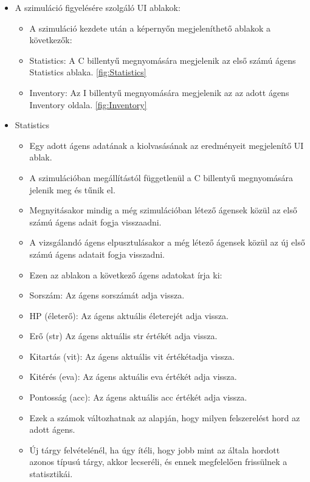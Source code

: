 \begin{itemize}
    \item A szimuláció figyelésére szolgáló UI ablakok:
    
    \begin{itemize}
        \item A szimuláció kezdete után a képernyőn megjeleníthető ablakok a következők:
        \item Statistics: A C billentyű megnyomására megjelenik az első számú ágens Statistics ablaka. \ref{fig:Statistics}
        \item Inventory: Az I billentyű megnyomására megjelenik az az adott ágens Inventory oldala. \ref{fig:Inventory}
    \end{itemize}

    \item Statistics
    
    \begin{itemize}
        \item Egy adott ágens adatának a kiolvasásának az eredményeit megjelenítő UI ablak. 
        \item A szimulációban megállítástól függetlenül a C billentyű megnyomására jelenik meg és tűnik el.
        \item Megnyitásakor mindig a még szimulációban létező ágensek közül az első számú ágens adait fogja visszaadni.
        \item A vizsgálandó ágens elpusztulásakor a még létező ágensek közül az új első számú ágens adatait fogja visszadni.
        \item Ezen az ablakon a következő ágens adatokat írja ki:
        \item Sorszám: Az ágens sorszámát adja vissza.
        \item HP (életerő): Az ágens aktuális életerejét adja vissza.
        \item Erő (str) Az ágens aktuális str értékét adja vissza.
        \item Kitartás (vit): Az ágens aktuális vit értékétadja vissza.
        \item Kitérés (eva): Az ágens aktuális eva értékét adja vissza.
        \item Pontosság (acc): Az ágens aktuális acc értékét adja vissza.
        \item Ezek a számok változhatnak az alapján, hogy milyen felszerelést hord az adott ágens.
        \item Új tárgy felvételénél, ha úgy ítéli, hogy jobb mint az általa hordott azonos típusú tárgy, akkor lecseréli, és ennek megfelelően frissülnek a statisztikái.
    \end{itemize}


\end{itemize}
